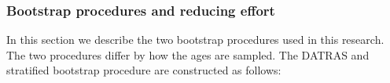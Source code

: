 \documentclass[a4paper 12pt]{article}
\numberwithin{equation}{section}
\newcommand{\olav}[1]{\textcolor{darkgreen}{#1}}
\begin{document}
\subsubsection{Bootstrap procedures and reducing effort}
\label{sec:datrasstratifiedbootstrap}
In this section we describe the two bootstrap procedures used in this research. The two procedures differ by how the ages are sampled.  %
The DATRAS and stratified bootstrap procedure are constructed as follows:
\end{document}
